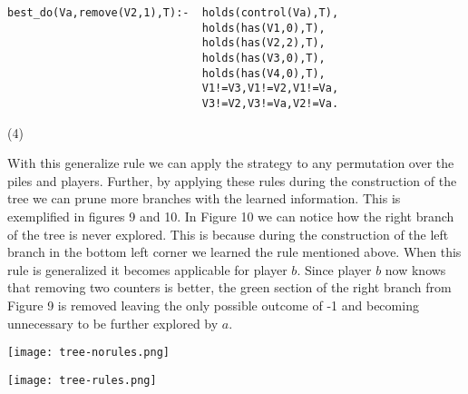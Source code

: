 \begin{minipage}{0.90\textwidth}
  \vspace{5px}
  \begin{verbatim}
best_do(Va,remove(V2,1),T):-  holds(control(Va),T),
                              holds(has(V1,0),T), 
                              holds(has(V2,2),T),
                              holds(has(V3,0),T),
                              holds(has(V4,0),T),
                              V1!=V3,V1!=V2,V1!=Va,
                              V3!=V2,V3!=Va,V2!=Va.
    \end{verbatim}
  \hfill
\end{minipage}
\begin{minipage}{0.05\textwidth}
  \hfill (4)
  \vspace{30px}
\end{minipage}


With this generalize rule we can apply the strategy to any permutation over the piles and players. Further, by applying these rules during the construction of the tree we can prune more branches with the learned information. This is exemplified in figures 9 and 10. In Figure 10 we can notice how the right branch of the tree is never explored. This is because during the construction of the left branch in the bottom left corner we learned the rule mentioned above. When this rule is generalized it becomes applicable for player $b$. Since player $b$ now knows that removing two counters is better, the green section of the right branch from Figure 9 is removed leaving the only possible outcome of -1 and becoming unnecessary to be further explored by $a$.


\begin{minipage}{0.45\textwidth}
  \centering
  \vspace{10px}
  \texttt{[image: tree-norules.png]}
  \vspace{15px}

\end{minipage}
\begin{minipage}{0.45\textwidth}
  \centering
  \vspace{10px}
  \texttt{[image: tree-rules.png]}
  \vspace{15px}

\end{minipage}



